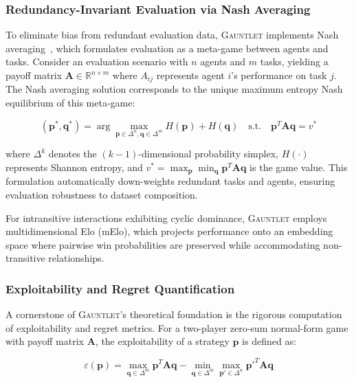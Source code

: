\documentclass[sigconf,anonymous]{aamas}
\begin{document}
\subsubsection{Redundancy-Invariant Evaluation via Nash Averaging   }

To eliminate bias from redundant evaluation data, \textsc{Gauntlet} implements Nash averaging~\cite{Balduzzi2018}, which formulates evaluation as a meta-game between agents and tasks. Consider an evaluation scenario with $n$ agents and $m$ tasks, yielding a payoff matrix $\mathbf{A} \in \mathbb{R}^{n \times m}$ where $A_{ij}$ represents agent $i$'s performance on task $j$. The Nash averaging solution corresponds to the unique maximum entropy Nash equilibrium of this meta-game:

\begin{equation}
(\mathbf{p}^*, \mathbf{q}^*) = \arg\max_{\mathbf{p} \in \Delta^n, \mathbf{q} \in \Delta^m} H(\mathbf{p}) + H(\mathbf{q}) \quad \text{s.t.} \quad \mathbf{p}^T \mathbf{A} \mathbf{q} = v^*
\end{equation}

where $\Delta^k$ denotes the $(k-1)$-dimensional probability simplex, $H(\cdot)$ represents Shannon entropy, and $v^* = \max_{\mathbf{p}} \min_{\mathbf{q}} \mathbf{p}^T \mathbf{A} \mathbf{q}$ is the game value. This formulation automatically down-weights redundant tasks and agents, ensuring evaluation robustness to dataset composition.

For intransitive interactions exhibiting cyclic dominance, \textsc{Gauntlet} employs multidimensional Elo (mElo), which projects performance onto an embedding space where pairwise win probabilities are preserved while accommodating non-transitive relationships.

\subsubsection{Exploitability and Regret Quantification}

A cornerstone of \textsc{Gauntlet}'s theoretical foundation is the rigorous computation of exploitability and regret metrics. For a two-player zero-sum normal-form game with payoff matrix $\mathbf{A}$, the exploitability of a strategy $\mathbf{p}$ is defined as:

\begin{equation}
\varepsilon(\mathbf{p}) = \max_{\mathbf{q} \in \Delta^m} \mathbf{p}^T \mathbf{A} \mathbf{q} - \min_{\mathbf{q} \in \Delta^m} \max_{\mathbf{p}' \in \Delta^n} \mathbf{p}'^T \mathbf{A} \mathbf{q}
\label{eq:exploitability}
\end{equation}
\end{document}
